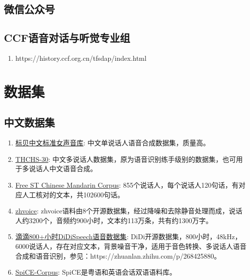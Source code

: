\documentclass[cn,10pt,math=newtx,citestyle=gb7714-2015,bibstyle=gb7714-2015]{elegantbook}
\begin{document}
\subsection{微信公众号}

\subsection{CCF语音对话与听觉专业组}
\begin{enumerate}
  \item https://history.ccf.org.cn/tfsdap/index.html
\end{enumerate}

\section{数据集}
\subsection{中文数据集}
\begin{enumerate}
  \item \href{https://www.data-baker.com/open_source.html}{标贝中文标准女声音库}: 中文单说话人语音合成数据集，质量高。
  \item \href{https://www.openslr.org/18/}{THCHS-30}: 中文多说话人数据集，原为语音识别练手级别的数据集，也可用于多说话人中文语音合成。
  \item \href{https://www.openslr.org/38/}{Free ST Chinese Mandarin Corpus}: 855个说话人，每个说话人120句话，有对应人工核对的文本，共102600句话。
  \item \href{https://github.com/KuangDD/zhvoice}{zhvoice}: zhvoice语料由8个开源数据集，经过降噪和去除静音处理而成，说话人约3200个，音频约900小时，文本约113万条，共有约1300万字。
  \item \href{https://arxiv.org/abs/2010.09275}{滴滴800+小时DiDiSpeech语音数据集}: DiDi开源数据集，800小时，48kHz，6000说话人，存在对应文本，背景噪音干净，适用于音色转换、多说话人语音合成和语音识别，参见：https://zhuanlan.zhihu.com/p/268425880。
  \item \href{https://github.com/khiajohnson/SpiCE-Corpus}{SpiCE-Corpus}: SpiCE是粤语和英语会话双语语料库。
\end{enumerate}
\end{document}
